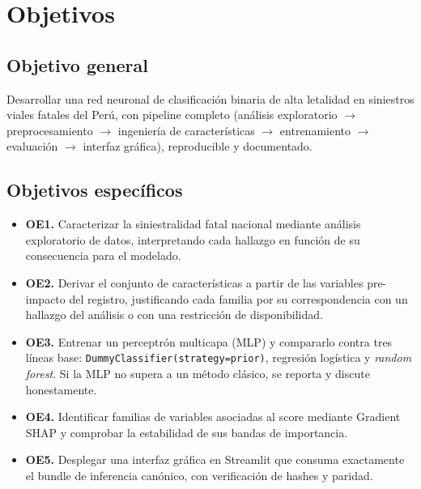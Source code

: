 \section{Objetivos}\label{sec:objetivos}

\subsection{Objetivo general}
Desarrollar una red neuronal de clasificación binaria de alta letalidad en siniestros viales fatales del Perú, con pipeline completo (análisis exploratorio $\rightarrow$ preprocesamiento $\rightarrow$ ingeniería de características $\rightarrow$ entrenamiento $\rightarrow$ evaluación $\rightarrow$ interfaz gráfica), reproducible y documentado.

\subsection{Objetivos específicos}
\begin{itemize}
  \item \textbf{OE1.} Caracterizar la siniestralidad fatal nacional mediante análisis exploratorio de datos, interpretando cada hallazgo en función de su consecuencia para el modelado.
  \item \textbf{OE2.} Derivar el conjunto de características a partir de las variables pre-impacto del registro, justificando cada familia por su correspondencia con un hallazgo del análisis o con una restricción de disponibilidad.
  \item \textbf{OE3.} Entrenar un perceptrón multicapa (MLP) y compararlo contra tres líneas base: \texttt{DummyClassifier(strategy=prior)}, regresión logística y \emph{random forest}. Si la MLP no supera a un método clásico, se reporta y discute honestamente.
  \item \textbf{OE4.} Identificar familias de variables asociadas al score mediante Gradient SHAP y comprobar la estabilidad de sus bandas de importancia.
  \item \textbf{OE5.} Desplegar una interfaz gráfica en Streamlit que consuma exactamente el bundle de inferencia canónico, con verificación de hashes y paridad.
\end{itemize}

